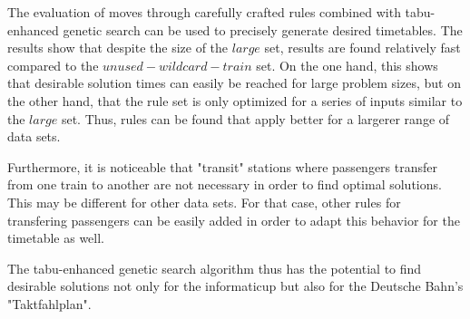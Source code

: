 \documentclass[a4paper,10pt,parskip]{article}
\begin{document}
The evaluation of moves through carefully crafted rules combined with tabu-enhanced
genetic search can be used to precisely generate desired timetables. The results 
show that despite the size of the $large$ set, results are found relatively fast 
compared to the $unused-wildcard-train$ set. On the one hand, this shows that 
desirable solution times can easily be reached for large problem sizes, but on 
the other hand, that the rule set is only optimized for a series of inputs similar 
to the $large$ set. Thus, rules can be found that apply better for a largerer range 
of data sets.

Furthermore, it is noticeable that "transit" stations where passengers transfer 
from one train to another are not necessary in order to find optimal solutions. 
This may be different for other data sets. For that case, other rules for 
transfering passengers can be easily added in order to adapt this behavior for 
the timetable as well.

The tabu-enhanced genetic search algorithm thus has the potential to find desirable 
solutions not only for the informaticup but also for the Deutsche Bahn's 
"Taktfahlplan".

 

\end{document}
